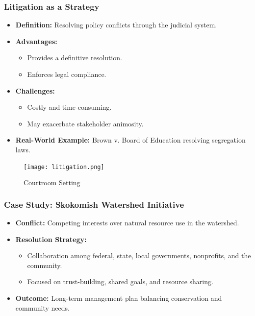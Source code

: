 \documentclass[10pt]{beamer}
\begin{document}
\begin{frame}
        \begin{frame}
        \frametitle{Litigation as a Strategy}
        \begin{itemize}
            \item \textbf{Definition:} Resolving policy conflicts through the judicial system.
            \item \textbf{Advantages:}
                \begin{itemize}
                    \item Provides a definitive resolution.
                    \item Enforces legal compliance.
                \end{itemize}
            \item \textbf{Challenges:}
                \begin{itemize}
                    \item Costly and time-consuming.
                    \item May exacerbate stakeholder animosity.
                \end{itemize}
            \item \textbf{Real-World Example:} Brown v. Board of Education resolving segregation laws.
        \end{itemize}
        
        \begin{figure}
            \centering
            \texttt{[image: litigation.png]}
            \caption{Courtroom Setting}
        \end{figure}
        \end{frame}
        
        \begin{frame}
        \frametitle{Case Study: Skokomish Watershed Initiative}
        \begin{itemize}
            \item \textbf{Conflict:} Competing interests over natural resource use in the watershed.
            \item \textbf{Resolution Strategy:}
                \begin{itemize}
                    \item Collaboration among federal, state, local governments, nonprofits, and the community.
                    \item Focused on trust-building, shared goals, and resource sharing.
                \end{itemize}
            \item \textbf{Outcome:} Long-term management plan balancing conservation and community needs.
        \end{itemize}
        

\end{frame}
\end{frame}
\end{document}
